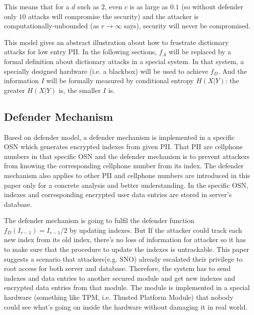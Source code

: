\documentclass[10pt, conference, compsocconf]{IEEEtran}
\begin{document}
        This means that for a $d$ such as $2$, even $c$ is as large as
        $0.1$ (so without defender only $10$ attacks will compromise
        the security) and the attacker is computationally-unbounded
        (as $r \rightarrow \infty$ says), security will
        never be compromised.
        
        This model gives an abstract illustration about how to frustrate
        dictionary attacks for low entry PII.
        In the following sections, $f_A$ will be replaced by a formal definition
       	about dictionary attacks in a special system.
        In that system, a specially designed hardware (i.e. a blackbox) 
        will be used to achieve $f_D$.
        And the information $I$ will be formally
        measured by conditional entropy $H(X|Y)$: the greater $H(X|Y)$
        is, the smaller $I$ is.

    \subsection{Defender Mechanism}\label{sec_ds}
        Based on defender model, a defender mechanism is implemented
        in a specific OSN
        which generates encrypted indexes
        from given PII. That PII are cellphone numbers
        in that specific OSN and the defender mechanism is to prevent attackers
        from knowing the corresponding cellphone number from its index.
        The defender mechanism also applies to other PII and cellphone numbers are introduced
        in this paper only for a concrete analysis and better understanding.
        In the specific OSN, indexes and corresponding encrypted user data entries are stored
        in server's database.

        The defender mechanism is going to fulfil the defender
        function $f_D(I_{r-1}) = I_{r-1}/2$ by updating indexes.
        But If the attacker
        could track each new index from its old index, there's no loss of information
        for attacker so it has to make sure that the procedure to update the indexes
        is untrackable.
        This paper suggests a scenario that attackers(e.g. SNO) already
        escalated their privilege to root access for
        both server and database. Therefore, the system has to send
        indexes and data entries to another
        secured module and get new indexes and encrypted data
        entries from that module.
        The module is implemented in a special hardware (something
        like TPM, i.e. Thusted Platform Module) that nobody
        could see what's going on inside the hardware without damaging it in real world.
\end{document}

